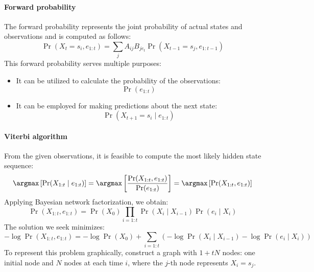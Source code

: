 \paragraph*{Forward probability}
The forward probability represents the joint probability of actual states and observations and is computed as follows:
\[\Pr(X_t=s_i,e_{1:t})=\sum_j A_{ij}B_{je_t}\Pr(X_{t-1}=s_j,e_{1:t-1})\]
This forward probability serves multiple purposes:
\begin{itemize}
    \item It can be utilized to calculate the probability of the observations:
        \[\Pr(e_{1:t})\]
    \item It can be employed for making predictions about the next state:
        \[\Pr(X_{t+1}=s_i\mid e_{1:t})\]
\end{itemize}

\paragraph*{Viterbi algorithm}
From the given observations, it is feasible to compute the most likely hidden state sequence:
\[\argmax\left[\Pr(X_{1:t}\mid e_{1:t})\right]=\argmax\left[\dfrac{\Pr(X_{1:t},e_{1:t})}{\Pr(e_{1:t})}\right]=\argmax\left[\Pr(X_{1:t},e_{1:t})\right]\]
Applying Bayesian network factorization, we obtain:
\[\Pr(X_{1:t},e_{1:t})=\Pr(X_0)\prod_{i=1:t}\Pr(X_i\mid X_{i-1})\Pr(e_i\mid X_i)\]
The solution we seek minimizes:
\[-\log\Pr(X_{1:t},e_{1:t})=-\log\Pr(X_0)+\sum_{i=1:t}\left(-\log\Pr(X_i\mid X_{i-1})-\log\Pr(e_i\mid X_i)\right)\]
To represent this problem graphically, construct a graph with $1 + tN$ nodes: one initial node and $N$ nodes at each time $i$, where the $j$-th node represents $X_i=s_j$.